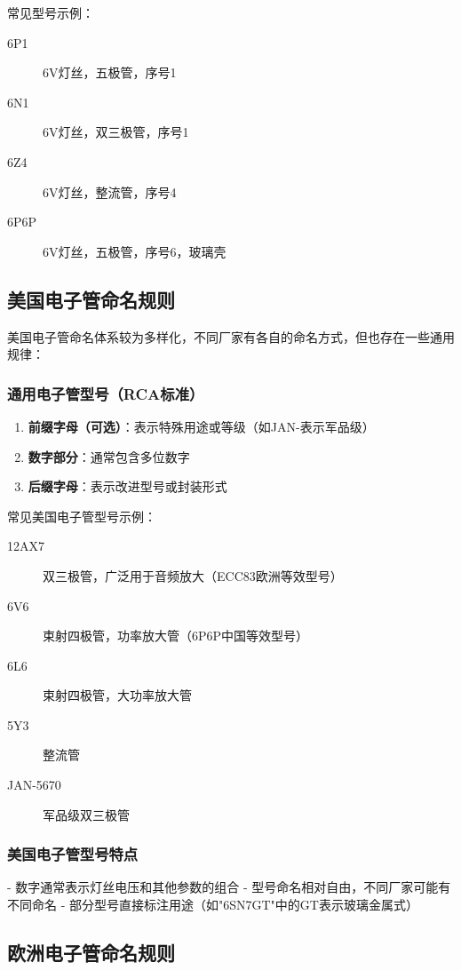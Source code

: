 \documentclass[12pt,UTF8]{ctexbook}
\begin{document}
常见型号示例：
\begin{description}
    \item[6P1] 6V灯丝，五极管，序号1
    \item[6N1] 6V灯丝，双三极管，序号1
    \item[6Z4] 6V灯丝，整流管，序号4
    \item[6P6P] 6V灯丝，五极管，序号6，玻璃壳
\end{description}

\subsection{美国电子管命名规则}

美国电子管命名体系较为多样化，不同厂家有各自的命名方式，但也存在一些通用规律：

\subsubsection{通用电子管型号（RCA标准）}
\begin{enumerate}
    \item \textbf{前缀字母（可选）}：表示特殊用途或等级（如JAN-表示军品级）
    \item \textbf{数字部分}：通常包含多位数字
    \item \textbf{后缀字母}：表示改进型号或封装形式
\end{enumerate}

常见美国电子管型号示例：
\begin{description}
    \item[12AX7] 双三极管，广泛用于音频放大（ECC83欧洲等效型号）
    \item[6V6] 束射四极管，功率放大管（6P6P中国等效型号）
    \item[6L6] 束射四极管，大功率放大管
    \item[5Y3] 整流管
    \item[JAN-5670] 军品级双三极管
\end{description}

\subsubsection{美国电子管型号特点}
- 数字通常表示灯丝电压和其他参数的组合
- 型号命名相对自由，不同厂家可能有不同命名
- 部分型号直接标注用途（如"6SN7GT"中的GT表示玻璃金属式）

\subsection{欧洲电子管命名规则}
\end{document}
